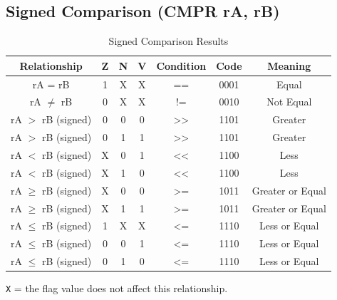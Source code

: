 \subsection{Signed Comparison (CMPR rA, rB)}

\begin{table}[H]
	\centering
	\begin{tabular}{ccccccc}
		\toprule
		\textbf{Relationship} & \textbf{Z} & \textbf{N} & \textbf{V} & \textbf{Condition} & \textbf{Code} & \textbf{Meaning} \\
		\midrule
		rA = rB               & 1          & X          & X          & ==                 & 0001          & Equal            \\
		rA $\neq$ rB          & 0          & X          & X          & !=                 & 0010          & Not Equal        \\
		rA $>$ rB (signed)    & 0          & 0          & 0          & >>                 & 1101          & Greater          \\
		rA $>$ rB (signed)    & 0          & 1          & 1          & >>                 & 1101          & Greater          \\
		rA $<$ rB (signed)    & X          & 0          & 1          & <<                 & 1100          & Less             \\
		rA $<$ rB (signed)    & X          & 1          & 0          & <<                 & 1100          & Less             \\
		rA $\geq$ rB (signed) & X          & 0          & 0          & >=                 & 1011          & Greater or Equal \\
		rA $\geq$ rB (signed) & X          & 1          & 1          & >=                 & 1011          & Greater or Equal \\
		rA $\leq$ rB (signed) & 1          & X          & X          & <=                 & 1110          & Less or Equal    \\
		rA $\leq$ rB (signed) & 0          & 0          & 1          & <=                 & 1110          & Less or Equal    \\
		rA $\leq$ rB (signed) & 0          & 1          & 0          & <=                 & 1110          & Less or Equal    \\
		\bottomrule
	\end{tabular}
	\caption{Signed Comparison Results}

	\smallskip
	\texttt{X} = the flag value does not affect this relationship.
\end{table}

